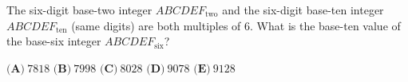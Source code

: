 The six-digit base-two integer $ABCDEF_{\text{two}}$ and the six-digit base-ten integer $ABCDEF_{\text{ten}}$ (same digits) are both multiples of $6$. What is the base-ten value of the base-six integer $ABCDEF_{\text{six}}$?

$\textbf{(A)}\ 7818$ \qquad $\textbf{(B)}\ 7998$ \qquad $\textbf{(C)}\ 8028$ \qquad $\textbf{(D)}\ 9078$ \qquad $\textbf{(E)}\ 9128$

